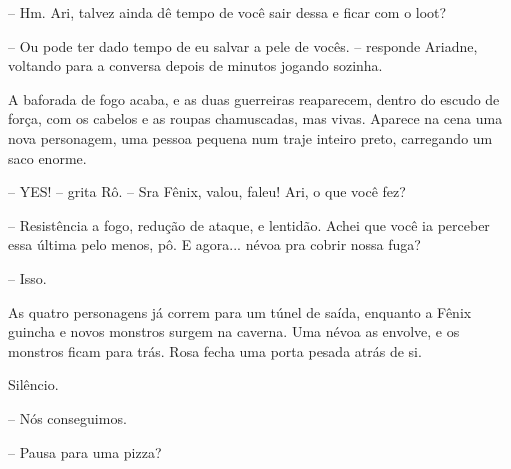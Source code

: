 -- Hm. Ari, talvez ainda dê tempo de você sair dessa e ficar com o loot?

-- Ou pode ter dado tempo de eu salvar a pele de vocês. -- responde Ariadne, voltando para a conversa depois de minutos jogando sozinha.

A baforada de fogo acaba, e as duas guerreiras reaparecem, dentro do escudo de força, com os cabelos e as roupas chamuscadas, mas vivas. Aparece na cena uma nova personagem, uma pessoa pequena num traje inteiro preto, carregando um saco enorme.

-- YES! -- grita Rô. -- Sra Fênix, valou, faleu! Ari, o que você fez?

-- Resistência a fogo, redução de ataque, e lentidão. Achei que você ia perceber essa última pelo menos, pô. E agora... névoa pra cobrir nossa fuga?

-- Isso.

As quatro personagens já correm para um túnel de saída, enquanto a Fênix guincha e novos monstros surgem na caverna. Uma névoa as envolve, e os monstros ficam para trás. Rosa fecha uma porta pesada atrás de si.

Silêncio.

-- Nós conseguimos.

-- Pausa para uma pizza?

